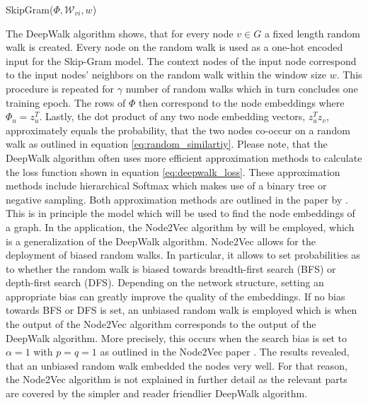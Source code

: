 	\begin{algorithm}
		\scriptsize
		\SetAlgoLined
		\nl {}
		\caption{SkipGram($\Phi,\mathcal{W}_{vi},w$)}
		\label{algo:SkipGram}
	\end{algorithm}
	
	\vspace{5mm}
	
	\noindent The DeepWalk algorithm shows, that for every node $v\in G$ a
	fixed length random walk is created. Every node on the random walk is used
	as a one-hot encoded input for the Skip-Gram model. The context nodes of the
	input node correspond to the input nodes' neighbors on the random walk 
	within the window size $w$. This procedure is repeated for $\gamma$ 
	number of random walks which in turn concludes one training epoch. The rows
	of $\Phi$ then correspond to the node embeddings where
	$\Phi_{u}=z_{u}^{T}$. Lastly, the dot product of any two node embedding
	vectors, $z_{u}^{T}z_{v}$, approximately equals the probability, that the
	two nodes co-occur on a random walk as outlined in equation 
	\ref{eq:random_similartiy}. Please note, that the DeepWalk algorithm often 
	uses more efficient approximation methods to calculate the loss function
	shown in equation \ref{eq:deepwalk_loss}. These approximation methods
	include hierarchical Softmax which makes use of a binary tree or negative 
	sampling. Both approximation methods are outlined in the paper by 
	\cite{mikolov2013distributed}. \\

	\noindent This is in principle the model which will be used to find the node
	embeddings of a graph. In the application, the Node2Vec algorithm by
	\cite{grover2016node2vec} will be employed, which is a generalization of 
	the DeepWalk algorithm. Node2Vec allows for the deployment of biased random 
	walks. In particular, it allows to set probabilities as to whether the 
	random walk is biased towards breadth-first search (BFS) or depth-first 
	search (DFS). Depending on the network structure, setting an appropriate 
	bias can greatly improve the quality of the embeddings. If no bias towards 
	BFS or DFS is set, an unbiased random walk is employed which is when
	the output of the Node2Vec algorithm corresponds to the output of the 
	DeepWalk algorithm. More precisely, this occurs when the search bias is set
	to $\alpha = 1$ with $p=q=1$ as outlined in the Node2Vec paper 
	\citep[p. 860]{grover2016node2vec}. The results revealed, that an unbiased 
	random walk embedded the nodes very well. For that reason, the Node2Vec 
	algorithm is not explained in further detail as the relevant parts are 
	covered by the simpler and reader friendlier DeepWalk algorithm. \\

